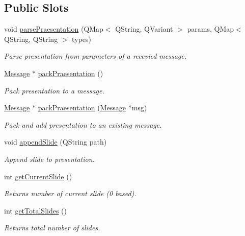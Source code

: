 \subsection*{Public Slots}
\begin{DoxyCompactItemize}
\item 
void \hyperlink{class_praesentation_a5608fefeee163857cb9d97658fbee5bc}{parse\+Praesentation} (Q\+Map$<$ Q\+String, Q\+Variant $>$ params, Q\+Map$<$ Q\+String, Q\+String $>$ types)
\begin{DoxyCompactList}\small\item\em Parse presentation from parameters of a recevied message. \end{DoxyCompactList}\item 
\hyperlink{class_message}{Message} $\ast$ \hyperlink{class_praesentation_a961ebbe5eac800ac68c161d8988081c2}{pack\+Praesentation} ()
\begin{DoxyCompactList}\small\item\em Pack presentation to a message. \end{DoxyCompactList}\item 
\hyperlink{class_message}{Message} $\ast$ \hyperlink{class_praesentation_ac1b47928e9f78a9be6b56164c214a4e8}{pack\+Praesentation} (\hyperlink{class_message}{Message} $\ast$msg)
\begin{DoxyCompactList}\small\item\em Pack and add presentation to an existing message. \end{DoxyCompactList}\item 
void \hyperlink{class_praesentation_ac485a89b9912c18234498c079948d6a1}{append\+Slide} (Q\+String path)
\begin{DoxyCompactList}\small\item\em Append slide to presentation. \end{DoxyCompactList}\item 
int \hyperlink{class_praesentation_ac58bce0421510a4f1604a78565068b2d}{get\+Current\+Slide} ()
\begin{DoxyCompactList}\small\item\em Returns number of current slide (0 based). \end{DoxyCompactList}\item 
int \hyperlink{class_praesentation_ab3376c4aae9f4304dce046e861a4afd7}{get\+Total\+Slides} ()
\begin{DoxyCompactList}\small\item\em Returns total number of slides. \end{DoxyCompactList}\item 

\end{DoxyCompactItemize}
